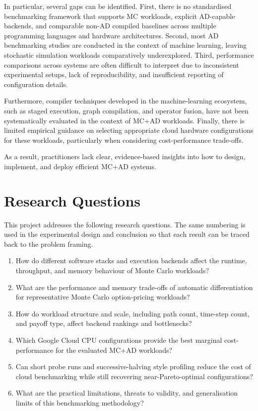 In particular, several gaps can be identified. First, there is no standardised benchmarking framework that supports MC workloads, explicit AD-capable backends, and comparable non-AD compiled baselines across multiple programming languages and hardware architectures. Second, most AD benchmarking studies are conducted in the context of machine learning, leaving stochastic simulation workloads comparatively underexplored. Third, performance comparisons across systems are often difficult to interpret due to inconsistent experimental setups, lack of reproducibility, and insufficient reporting of configuration details.

Furthermore, compiler techniques developed in the machine-learning ecosystem, such as staged execution, graph compilation, and operator fusion, have not been systematically evaluated in the context of MC+AD workloads. Finally, there is limited empirical guidance on selecting appropriate cloud hardware configurations for these workloads, particularly when considering cost-performance trade-offs.

As a result, practitioners lack clear, evidence-based insights into how to design, implement, and deploy efficient MC+AD systems.

\section{Research Questions}

This project addresses the following research questions. The same numbering is
used in the experimental design and conclusion so that each result can be traced
back to the problem framing.

\begin{enumerate}[label=\textbf{RQ\arabic*.}]
    \item How do different software stacks and execution backends affect the runtime, throughput, and memory behaviour of Monte Carlo workloads?
    \item What are the performance and memory trade-offs of automatic differentiation for representative Monte Carlo option-pricing workloads?
    \item How do workload structure and scale, including path count, time-step count, and payoff type, affect backend rankings and bottlenecks?
    \item Which Google Cloud CPU configurations provide the best marginal cost-performance for the evaluated MC+AD workloads?
    \item Can short probe runs and successive-halving style profiling reduce the cost of cloud benchmarking while still recovering near-Pareto-optimal configurations?
    \item What are the practical limitations, threats to validity, and generalisation limits of this benchmarking methodology?
\end{enumerate}

